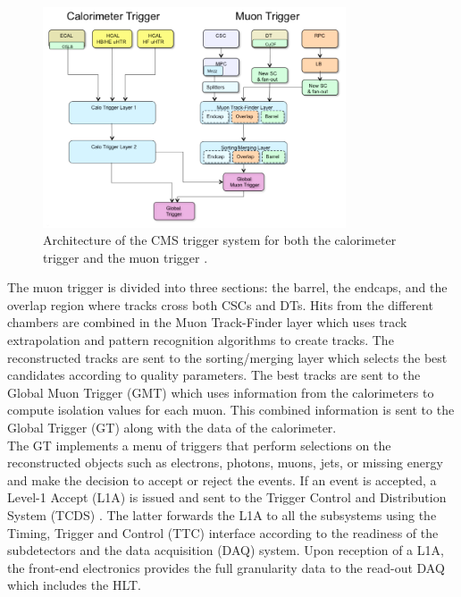     \begin{figure}[t!]
      \centering
      \includegraphics[width=0.8\textwidth]{img/I-3-cms/l1.png}
      \caption{Architecture of the CMS trigger system for both the calorimeter trigger and the muon trigger \cite{Tapper:1556311}.}
      \label{fig:I-3-l1}
    \end{figure}

    The muon trigger is divided into three sections: the barrel, the endcaps, and the overlap region where tracks cross both CSCs and DTs. Hits from the different chambers are combined in the Muon Track-Finder layer which uses track extrapolation and pattern recognition algorithms to create tracks. The reconstructed tracks are sent to the sorting/merging layer which selects the best candidates according to quality parameters. The best tracks are sent to the Global Muon Trigger (GMT) which uses information from the calorimeters to compute isolation values for each muon. This combined information is sent to the Global Trigger (GT) along with the data of the calorimeter. \\

    The GT implements a menu of triggers that perform selections on the reconstructed objects such as electrons, photons, muons, jets, or missing energy and make the decision to accept or reject the events. If an event is accepted, a Level-1 Accept (L1A) is issued and sent to the Trigger Control and Distribution System (TCDS) \cite{Tapper:1556311}. The latter forwards the L1A to all the subsystems using the Timing, Trigger and Control (TTC) interface according to the readiness of the subdetectors and the data acquisition (DAQ) system. Upon reception of a L1A, the front-end electronics provides the full granularity data to the read-out DAQ which includes the HLT.


